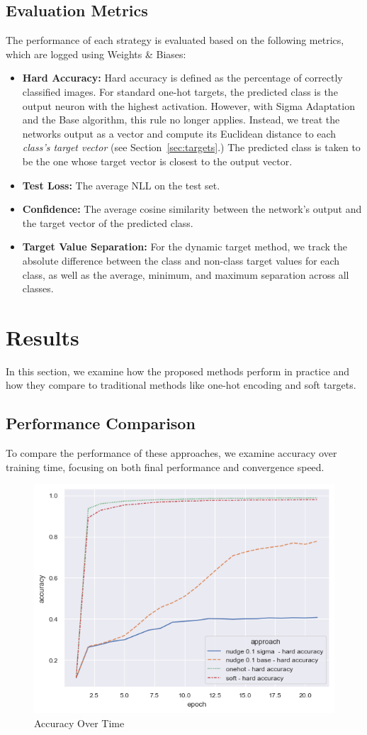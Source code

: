 \documentclass[12pt,fleqn,a4paper]{article}
\begin{document}
 \subsection{Evaluation Metrics}
 The performance of each strategy is evaluated based on the following metrics, which are logged using Weights \& Biases:
 \begin{itemize}
     \item \textbf{Hard Accuracy:} Hard accuracy is defined as the percentage of correctly classified images. For standard one-hot targets, the predicted class is the output neuron with the highest activation. However, with Sigma Adaptation and the Base algorithm, this rule no longer applies. Instead, we treat the networks output as a vector and compute its Euclidean distance to each \textit{class's target vector} (see Section~\ref{sec:targets}.) The predicted class is taken to be the one whose target vector is closest to the output vector.
     \item \textbf{Test Loss:} The average NLL on the test set.
     \item \textbf{Confidence:} The average cosine similarity between the network's output and the target vector of the predicted class.
     \item \textbf{Target Value Separation:} For the dynamic target method, we track the absolute difference between the class and non-class target values for each class, as well as the average, minimum, and maximum separation across all classes.
 \end{itemize}

\section{Results}
In this section, we examine how the proposed methods perform in practice and how they compare to traditional methods like one-hot encoding and soft targets.

\subsection{Performance Comparison}
To compare the performance of these approaches, we examine accuracy over training time, focusing on both final performance and convergence speed.
\begin{figure}
    \centering
    \includegraphics[width=0.6\linewidth]{graphs/acc.png}
    \caption{Accuracy Over Time}
    \label{fig:acc}
\end{figure}
\end{document}
